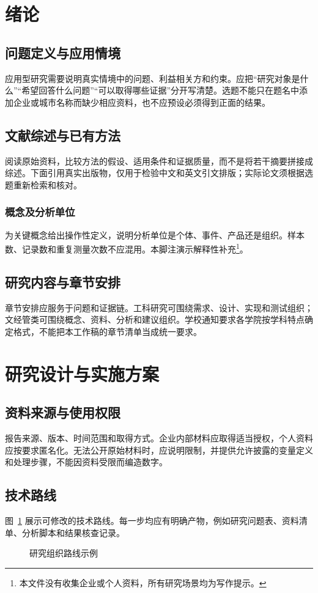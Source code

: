 \section{绪论}
\subsection{问题定义与应用情境}
应用型研究需要说明真实情境中的问题、利益相关方和约束。应把“研究对象是什么”“希望回答什么问题”“可以取得哪些证据”分开写清楚。选题不能只在题名中添加企业或城市名称而缺少相应资料，也不应预设必须得到正面的结果。
\subsection{文献综述与已有方法}
阅读原始资料，比较方法的假设、适用条件和证据质量，而不是将若干摘要拼接成综述。下面引用真实出版物，仅用于检验中文和英文引文排版\cite{zhou2016,lamport1994}；实际论文须根据选题重新检索和核对。
\subsubsection{概念及分析单位}
为关键概念给出操作性定义，说明分析单位是个体、事件、产品还是组织。样本数、记录数和重复测量次数不应混用。本脚注演示解释性补充\footnote{本文件没有收集企业或个人资料，所有研究场景均为写作提示。}。
\subsection{研究内容与章节安排}
章节安排应服务于问题和证据链。工科研究可围绕需求、设计、实现和测试组织；文经管类可围绕概念、资料、分析和建议组织。学校通知要求各学院按学科特点确定格式，不能把本工作稿的章节清单当成统一要求。
\clearpage\section{研究设计与实施方案}
\subsection{资料来源与使用权限}
报告来源、版本、时间范围和取得方式。企业内部材料应取得适当授权，个人资料应按要求匿名化。无法公开原始材料时，应说明限制，并提供允许披露的变量定义和处理步骤，不能因资料受限而编造数字。
\subsection{技术路线}
图~\ref{fig:route} 展示可修改的技术路线。每一步均应有明确产物，例如研究问题表、资料清单、分析脚本和结果核查记录。
\begin{figure}[htbp]\centering
{}
\caption{研究组织路线示例}\label{fig:route}
\end{figure}
